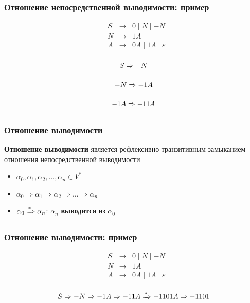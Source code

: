 \documentclass{beamer}
\newcommand{\derives}[1][*]{\xRightarrow[]{#1}}
\begin{document}
\begin{frame}[fragile]
  \transwipe[direction=90]
  \frametitle{Отношение непосредственной выводимости: пример}
  \[
  \begin{array}{crcl}
  &S& \rightarrow & 0 \mid N \mid - N  \\
  &N& \rightarrow & 1 A \\
  &A& \rightarrow & 0 A \mid 1 A  \mid \varepsilon\\
  \end{array}
  \]

\vspace{10pt}

\[S \derives[] -N\]

\[-N \derives[] -1A\]

\[-1A \derives[] -11A\]
\end{frame}


\begin{frame}[fragile]
  \transwipe[direction=90]
  \frametitle{Отношение выводимости}
  
  \begin{center}
    \textbf{Отношение выводимости} является рефлексивно-транзитивным замыканием отношения непосредственной выводимости
  \end{center}

  \begin{itemize}
    \item $\alpha_0, \alpha_1, \alpha_2, \dots, \alpha_n \in V^*$
    \item $\alpha_0 \Rightarrow \alpha_1 \Rightarrow \alpha_2 \Rightarrow \dots \Rightarrow \alpha_n$
    \item $\alpha_0 \derives \alpha_n$: $\alpha_n$ \textbf{выводится} из $\alpha_0$
  \end{itemize}
\end{frame}


\begin{frame}[fragile]
  \transwipe[direction=90]
  \frametitle{Отношение выводимости: пример}
  
  \[
  \begin{array}{crcl}
  &S& \rightarrow & 0 \mid N \mid - N  \\
  &N& \rightarrow & 1 A \\
  &A& \rightarrow & 0 A \mid 1 A  \mid \varepsilon\\
  \end{array}
  \]

  \[ S \Rightarrow - N \Rightarrow - 1 A \Rightarrow - 1 1 A \derives - 1 1 0 1 A \Rightarrow - 1 1 0 1 \]
\end{frame}
\end{document}
